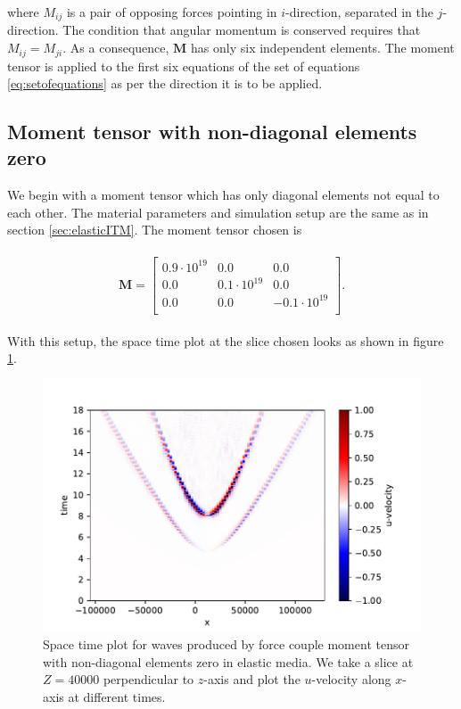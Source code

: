 where $M_{ij}$ is a pair of opposing forces pointing in $i$-direction, separated in the $j$-direction. The condition that angular momentum is conserved requires that $M_{ij} = M_{ji}$. As a consequence, $\mathbf{M}$ has only six independent elements. The moment tensor is applied to the first six equations of the set of equations \ref{eq:setofequations} as per the direction it is to be applied.
\subsection{Moment tensor with non-diagonal elements zero}
We begin with a moment tensor which has only diagonal elements not equal to each other. The material parameters and simulation setup are the same as in section \ref{sec:elasticITM}. The moment tensor chosen is

\begin{align}
    \begin{split}
        \mathbf{M} =
            \begin{bmatrix}
                0.9 \cdot10^{19} & 0.0 &0.0 \\
                0.0 & 0.1 \cdot 10^{19} & 0.0 \\
                0.0 & 0.0 & -0.1 \cdot 10^{19} \\
            \end{bmatrix} .
    \end{split}
\end{align}

With this setup, the space time plot at the slice chosen looks as shown in figure \ref{fig:space-timeplot-doublecouplediagnoITM}.

\begin{figure}[!htpb]
    \centering
    \includegraphics[width=0.75\linewidth]{figures/double-couple-diag-noITM.pdf}
    \caption{Space time plot for waves produced by force couple moment tensor with non-diagonal elements zero in elastic media. We take a slice at $Z=40000$ perpendicular to $z$-axis and plot the $u$-velocity along $x$-axis at different times.}
    \label{fig:space-timeplot-doublecouplediagnoITM}
\end{figure}

